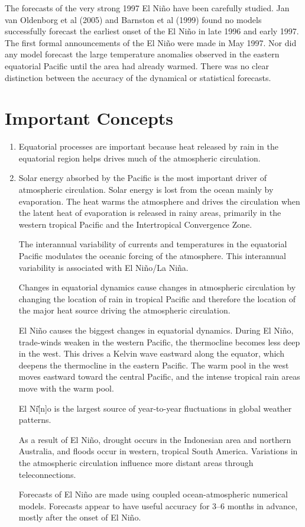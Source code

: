 The forecasts of the very strong 1997 El Ni\~{n}o have been carefully
studied. Jan van Oldenborg et al (2005) and Barnston et al (1999)
found no models successfully forecast the earliest onset of the El
Ni\~{n}o in late 1996 and early 1997. The first formal announcements
of the El Ni\~{n}o were made in May 1997. Nor did any model forecast
the large temperature anomalies observed in the eastern equatorial
Pacific until the area had already warmed. There was no clear
distinction between the accuracy of the dynamical or statistical
forecasts.

\section{Important Concepts}

\begin{enumerate}
\item Equatorial processes are important because heat released by rain
in the equatorial region helps drives much of the atmospheric
circulation.

\item Solar energy absorbed by the Pacific is the most important
driver of atmospheric circulation. Solar energy is lost from the
ocean mainly by evaporation. The heat warms the atmosphere and
drives the circulation when the latent heat of evaporation is
released in rainy areas, primarily in the western tropical Pacific
and the Intertropical Convergence Zone.

\vitem The interannual variability of currents and temperatures in the
equatorial Pacific modulates the oceanic forcing of the
atmosphere. This interannual variability is associated with El
Ni\~{n}o/La Ni\~{n}a.

\vitem Changes in equatorial dynamics cause changes in atmospheric
circulation by changing the location of rain in tropical Pacific and
therefore the location of the major heat source driving the
atmospheric circulation.

\vitem El Ni\~{n}o causes the biggest changes in equatorial
dynamics. During El Ni\~{n}o, trade-winds weaken in the western
Pacific, the thermocline becomes less
deep in the west. This drives a Kelvin wave
eastward along the equator, which deepens the thermocline in the
eastern Pacific. The warm pool in the west moves eastward toward the
central Pacific, and the intense tropical rain areas move with the
warm pool.

\vitem El Ni\~[n]o is the largest source of year-to-year fluctuations
in global weather patterns.

\vitem As a result of El Ni\~{n}o, drought occurs in the Indonesian
area and northern Australia, and floods occur in western, tropical
South America. Variations in the atmospheric circulation influence
more distant areas through teleconnections.

\vitem Forecasts of El Ni\~{n}o are made using coupled
ocean-atmospheric numerical models. Forecasts appear to have useful
accuracy for 3--6 months in
advance, mostly after the onset of El Ni\~{n}o.
\end{enumerate}


